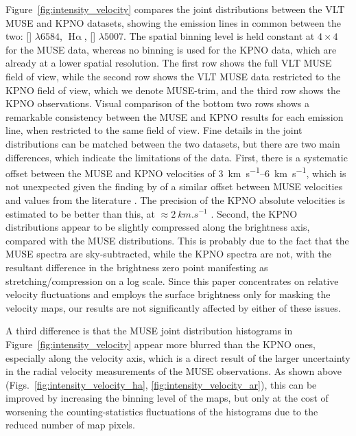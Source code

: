 \documentclass[fleqn,usenatbib, useAMS, a4paper]{mnras}
\newcommand\ha{\ensuremath{\text{H}\upalpha}}
\newcommand\Wav[1]{\ensuremath{\lambda #1}}
\newcommand\halpha{\ha}
\newcommand\n{[\ion{N}{II}] \Wav{6584}}
\newcommand\oiii{[\ion{O}{III}] \Wav{5007}}
\begin{document}
Figure~\ref{fig:intensity_velocity} compares the joint distributions between the
VLT MUSE and KPNO datasets, showing the emission lines in common between the two:
\n{}, \halpha{}, \oiii{}.
The spatial binning level is held constant at \(4 \times 4\) for the MUSE data,
whereas no binning is used for the KPNO data, which are already at a lower spatial resolution.
The first row shows the full VLT MUSE field of view, while the second row shows
the VLT MUSE data restricted to the KPNO field of view, which we denote MUSE-trim, and the third row shows the KPNO observations.
Visual comparison of the bottom two rows shows a remarkable consistency between the MUSE and KPNO
results for each emission line, when restricted to the same field of view.
Fine details in the joint distributions can be matched between the two datasets, but there are two main differences,
which indicate the limitations of the data.
First, there is a systematic offset between the MUSE and KPNO velocities of \qtyrange{3}{6}{km.s^{-1}},
which is not unexpected given the finding by \citet{2015A&A...582A.114W} of a similar offset between MUSE velocities
and values from the literature \citep{Baldwin:2000a}.
The precision of the KPNO absolute velocities is estimated to be better than this, at \(\approx \qty{2}{km.s^{-1}}\) \citep{Garcia-Diaz:2008a}.
Second, the KPNO distributions appear to be slightly compressed along the brightness axis,
compared with the MUSE distributions.
This is probably due to the fact that the MUSE spectra are sky-subtracted,
while the KPNO spectra are not,
with the resultant difference in the brightness zero point manifesting
as stretching/compression on a log scale.
Since this paper concentrates on relative velocity fluctuations and employs the surface brightness
only for masking the velocity maps,
our results are not significantly affected by either of these issues.

A third difference is that the MUSE joint distribution histograms in Figure~\ref{fig:intensity_velocity}
appear more blurred than the KPNO ones, especially along the velocity axis,
which is a direct result of the larger uncertainty in the radial velocity measurements of the MUSE observations.
As shown above (Figs.~\ref{fig:intensity_velocity_ha}, \ref{fig:intensity_velocity_ar}),
this can be improved by increasing the binning level of the maps,
but only at the cost of worsening the counting-statistics fluctuations of the histograms
due to the reduced number of map pixels.
\end{document}
